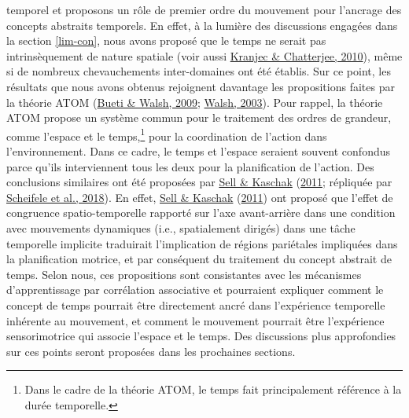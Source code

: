 \documentclass[
  a4paper,12pt,twoside,onecolumn,openright,final,oldfontcommands]{memoir}
\begin{document}
temporel et proposons un rôle de premier ordre du mouvement pour l'ancrage des concepts abstraits temporels. En effet, à la lumière des discussions engagées dans la section \ref{lim-con}, nous avons proposé que le temps ne serait pas intrinsèquement de nature spatiale (voir aussi \protect\hyperlink{ref-kranjec_are_2010}{Kranjec \& Chatterjee, 2010}), même si de nombreux chevauchements inter-domaines ont été établis. Sur ce point, les résultats que nous avons obtenus rejoignent davantage les propositions faites par la théorie ATOM (\protect\hyperlink{ref-bueti_parietal_2009}{Bueti \& Walsh, 2009}; \protect\hyperlink{ref-walsh_theory_2003}{Walsh, 2003}). Pour rappel, la théorie ATOM propose un système commun pour le traitement des ordres de grandeur, comme l'espace et le temps,\footnote{Dans le cadre de la théorie ATOM, le temps fait principalement référence à la durée temporelle.} pour la coordination de l'action dans l'environnement. Dans ce cadre, le temps et l'espace seraient souvent confondus parce qu'ils interviennent tous les deux pour la planification de l'action. Des conclusions similaires ont été proposées par \protect\hyperlink{ref-sell_processing_2011}{Sell \& Kaschak} (\protect\hyperlink{ref-sell_processing_2011}{2011}; répliquée par \protect\hyperlink{ref-scheifele_replication_2018}{Scheifele et al., 2018}). En effet, \protect\hyperlink{ref-sell_processing_2011}{Sell \& Kaschak} (\protect\hyperlink{ref-sell_processing_2011}{2011}) ont proposé que l'effet de congruence spatio-temporelle rapporté sur l'axe avant-arrière dans une condition avec mouvements dynamiques (i.e., spatialement dirigés) dans une tâche temporelle implicite traduirait l'implication de régions pariétales impliquées dans la planification motrice, et par conséquent du traitement du concept abstrait de temps. Selon nous, ces propositions sont consistantes avec les mécanismes d'apprentissage par corrélation associative et pourraient expliquer comment le concept de temps pourrait être directement ancré dans l'expérience temporelle inhérente au mouvement, et comment le mouvement pourrait être l'expérience sensorimotrice qui associe l'espace et le temps. Des discussions plus approfondies sur ces points seront proposées dans les prochaines sections.
\end{document}
